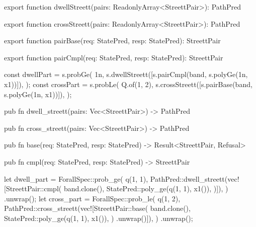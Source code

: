 \begin{tssrc}
export function dwellStreett(pairs: ReadonlyArray<StreettPair>): PathPred

export function crossStreett(pairs: ReadonlyArray<StreettPair>): PathPred

export function pairBase(req: StatePred, resp: StatePred): StreettPair

export function pairCmpl(req: StatePred, resp: StatePred): StreettPair
\end{tssrc}
\begin{tssrc}
const dwellPart = s.probGe(
  1n,
  s.dwellStreett([s.pairCmpl(band, s.polyGe(1n, x1))]),
);
const crossPart = s.probLe(
  Q.of(1, 2),
  s.crossStreett([s.pairBase(band, s.polyGe(1n, x1))]),
);
\end{tssrc}
\begin{rustsrc}
pub fn dwell_streett(pairs: Vec<StreettPair>) -> PathPred

pub fn cross_streett(pairs: Vec<StreettPair>) -> PathPred

pub fn base(req: StatePred, resp: StatePred) -> Result<StreettPair, Refusal>

pub fn cmpl(req: StatePred, resp: StatePred) -> StreettPair
\end{rustsrc}
\begin{rustsrc}
let dwell_part = ForallSpec::prob_ge(
    q(1, 1),
    PathPred::dwell_streett(vec![StreettPair::cmpl(
        band.clone(),
        StatePred::poly_ge(q(1, 1), x1()),
    )]),
)
.unwrap();
let cross_part = ForallSpec::prob_le(
    q(1, 2),
    PathPred::cross_streett(vec![StreettPair::base(
        band.clone(),
        StatePred::poly_ge(q(1, 1), x1()),
    )
    .unwrap()]),
)
.unwrap();
\end{rustsrc}
